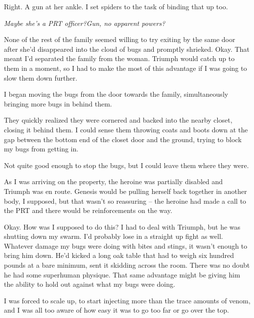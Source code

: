 Right.  A gun at her ankle.  I set spiders to the task of binding that up too.



\emph{Maybe she's a PRT officer?}\emph{Gun, no apparent powers?}



None of the rest of the family seemed willing to try exiting by the same door after she'd disappeared into the cloud of bugs and promptly shrieked.  Okay.  That meant I'd separated the family from the woman.  Triumph would catch up to them in a moment, so I had to make the most of this advantage if I was going to slow them down further.



I began moving the bugs from the door towards the family, simultaneously bringing more bugs in behind them.



They quickly realized they were cornered and backed into the nearby closet, closing it behind them.  I could sense them throwing coats and boots down at the gap between the bottom end of the closet door and the ground, trying to block my bugs from getting in.



Not quite good enough to stop the bugs, but I could leave them where they were.



As I was arriving on the property, the heroine was partially disabled and Triumph was en route.  Genesis would be pulling herself back together in another body, I supposed, but that wasn't so reassuring – the heroine had made a call to the PRT and there would be reinforcements on the way.



Okay.  How was I supposed to do this?  I had to deal with Triumph, but he was shutting down my swarm.  I'd probably lose in a straight up fight as well.  Whatever damage my bugs were doing with bites and stings, it wasn't enough to bring him down.  He'd kicked a long oak table that had to weigh six hundred pounds at a bare minimum, sent it skidding across the room.  There was no doubt he had some superhuman physique.  That same advantage might be giving him the ability to hold out against what my bugs were doing.



I was forced to scale up, to start injecting more than the trace amounts of venom, and I was all too aware of how easy it was to go too far or go over the top.



